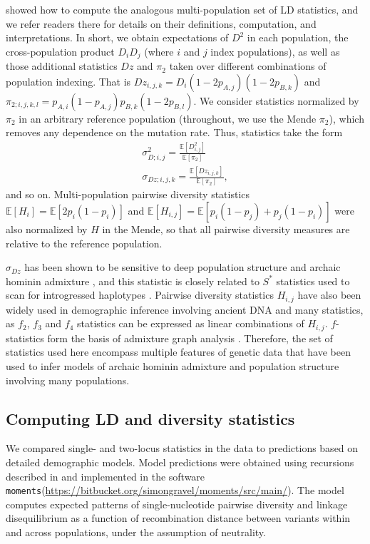 \documentclass[]{article}
\newcommand{\E}{\mathbb{E}}
\newcommand{\moments}{\texttt{moments}\xspace}
\begin{document}
\citet{Ragsdale2019-nt} showed how to compute the analogous multi-population
set of LD statistics, and we refer readers there for details on their
definitions, computation, and interpretations. In short, we obtain expectations
of $D^2$ in each population, the cross-population product $D_iD_j$ (where $i$
and $j$ index populations), as well as those additional statistics $Dz$ and
$\pi_2$ taken over different combinations of population indexing. That is
$Dz_{i, j, k} = D_i(1-2p_{A,j})(1-2p_{B,k})$ and
$\pi_{2;i,j,k,l}=p_{A,i}(1-p_{A,j})p_{B,k}(1-2p_{B,l})$. We consider statistics
normalized by $\pi_2$ in an arbitrary reference population (throughout, we use the Mende
$\pi_2$), which removes any dependence on the mutation rate. Thus, statistics
take the form 
\begin{equation}
\begin{split}
\sigma_{D;i,j}^2 = \frac{\E[D^2_{i,j}]}{\E[\pi_2]}\\
\sigma_{Dz;i,j,k}=\frac{\E[Dz_{i,j,k}]}{\E[\pi_2]},
\end{split}
\label{def_ld}
\end{equation}
and so on.
Multi-population pairwise diversity statistics $\E[H_i]=\E[2p_i(1-p_i)]$ and
$\E[H_{i,j}] = \E[p_i(1-p_j) + p_j(1-p_i)]$ were also normalized by $H$ in the
Mende, so that all pairwise diversity measures are relative to the reference
population.

$\sigma_{Dz}$ has been shown to be sensitive to deep population structure and
archaic hominin admixture \citep{Ragsdale2019-nt}, and this statistic is closely
related to $S^*$ statistics used to scan for introgressed haplotypes
\citep{Plagnol2006-lt}. Pairwise diversity statistics $H_{i,j}$ have also been
widely used in demographic inference involving ancient DNA and many statistics, as
$f_2$, $f_3$ and $f_4$ statistics can be expressed as linear combinations of
$H_{i,j}$. $f$-statistics form the basis of admixture graph analysis
\citep{Lipson2020-cq}. Therefore, the set of statistics used here encompass
multiple features of genetic data that have been used to infer models of
archaic hominin admixture and population structure involving many populations.

\subsection{Computing LD and diversity statistics}\label{sec:computing-stats}

We compared single- and two-locus statistics in the data to predictions based
on detailed demographic models. Model predictions were obtained using
recursions described in \citet{Ragsdale2019-nt} and implemented in the software
\moments (\url{https://bitbucket.org/simongravel/moments/src/main/}).
The model computes expected patterns of single-nucleotide pairwise diversity
and linkage disequilibrium as a function of recombination distance between
variants within and across populations, under the assumption of neutrality.
\end{document}
